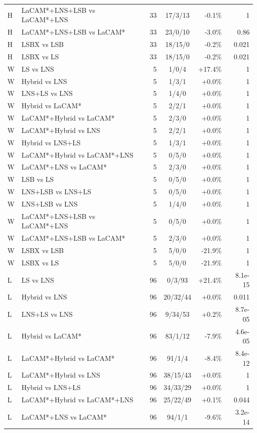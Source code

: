 \begin{table}[t]
\begin{tabular}{llrcrr}
H & LaCAM*+LNS+LSB vs LaCAM*+LNS & 33 & 17/3/13 & -0.1\% & 1\\
H & LaCAM*+LNS+LSB vs LaCAM* & 33 & 23/0/10 & -3.0\% & 0.86\\
H & LSBX vs LSB & 33 & 18/15/0 & -0.2\% & 0.021\\
H & LSBX vs LS & 33 & 18/15/0 & -0.2\% & 0.021\\
W & LS vs LNS & 5 & 1/0/4 & +17.4\% & 1\\
W & Hybrid vs LNS & 5 & 1/3/1 & +0.0\% & 1\\
W & LNS+LS vs LNS & 5 & 1/4/0 & +0.0\% & 1\\
W & Hybrid vs LaCAM* & 5 & 2/2/1 & +0.0\% & 1\\
W & LaCAM*+Hybrid vs LaCAM* & 5 & 2/3/0 & +0.0\% & 1\\
W & LaCAM*+Hybrid vs LNS & 5 & 2/2/1 & +0.0\% & 1\\
W & Hybrid vs LNS+LS & 5 & 1/3/1 & +0.0\% & 1\\
W & LaCAM*+Hybrid vs LaCAM*+LNS & 5 & 0/5/0 & +0.0\% & 1\\
W & LaCAM*+LNS vs LaCAM* & 5 & 2/3/0 & +0.0\% & 1\\
W & LSB vs LS & 5 & 0/5/0 & +0.0\% & 1\\
W & LNS+LSB vs LNS+LS & 5 & 0/5/0 & +0.0\% & 1\\
W & LNS+LSB vs LNS & 5 & 1/4/0 & +0.0\% & 1\\
W & LaCAM*+LNS+LSB vs LaCAM*+LNS & 5 & 0/5/0 & +0.0\% & 1\\
W & LaCAM*+LNS+LSB vs LaCAM* & 5 & 2/3/0 & +0.0\% & 1\\
W & LSBX vs LSB & 5 & 5/0/0 & -21.9\% & 1\\
W & LSBX vs LS & 5 & 5/0/0 & -21.9\% & 1\\
L & LS vs LNS & 96 & 0/3/93 & +21.4\% & 8.1e-15\\
L & Hybrid vs LNS & 96 & 20/32/44 & +0.0\% & 0.011\\
L & LNS+LS vs LNS & 96 & 9/34/53 & +0.2\% & 8.7e-05\\
L & Hybrid vs LaCAM* & 96 & 83/1/12 & -7.9\% & 4.6e-05\\
L & LaCAM*+Hybrid vs LaCAM* & 96 & 91/1/4 & -8.4\% & 8.4e-12\\
L & LaCAM*+Hybrid vs LNS & 96 & 38/15/43 & +0.0\% & 1\\
L & Hybrid vs LNS+LS & 96 & 34/33/29 & +0.0\% & 1\\
L & LaCAM*+Hybrid vs LaCAM*+LNS & 96 & 25/22/49 & +0.1\% & 0.044\\
L & LaCAM*+LNS vs LaCAM* & 96 & 94/1/1 & -9.6\% & 3.2e-14\\

\end{tabular}
\end{table}
